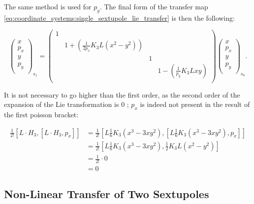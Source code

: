 The same method is used for $p_y$.
The final form of the transfer map \cref{eq:coordinate_systems:single_sextupole_lie_transfer} is
then the following:

\begin{equation}
    \begin{pmatrix}
        x \\
        p_x \\
        y \\
        p_y \\
    \end{pmatrix}_{s_1}
    =
    \begin{pmatrix}
        1 &  &  &  \\
         & 1 + \left(\frac{1}{2 p_x}K_3L(x^2-y^2)\right) &  & \\
         & & 1 & \\
         & &  & 1 - \left(\frac{1}{p_y}K_3Lxy\right)\\ 
    \end{pmatrix}
    \begin{pmatrix}
        x \\
        p_x \\
        y \\
        p_y \\
    \end{pmatrix}_{s_0}.
\end{equation}


It is not necessary to go higher than the first order, as the second order of the expansion of the 
Lie transformation is 0 ; $p_x$ is indeed not present in the result of the first poisson bracket:

\begin{equation}
    \begin{aligned}
    \frac{1}{2!} [L \cdot H_3, [L \cdot H_3, p_x]]
    &= \frac{1}{2!}\left[L \frac{1}{6} K_3 (x^3 - 3xy^2), \left[L \frac{1}{6} K_3 (x^3 - 3xy^2), p_x\right]\right] \\
    &= \frac{1}{2!}\left[L \frac{1}{6} K_3 (x^3 - 3xy^2), \frac{1}{2} K_3 L (x^2 - y^2)\right] \\
    &= \frac{1}{2!} \cdot 0 \\
    &= 0
    \end{aligned}
\end{equation}



\subsection{Non-Linear Transfer of Two Sextupoles}

